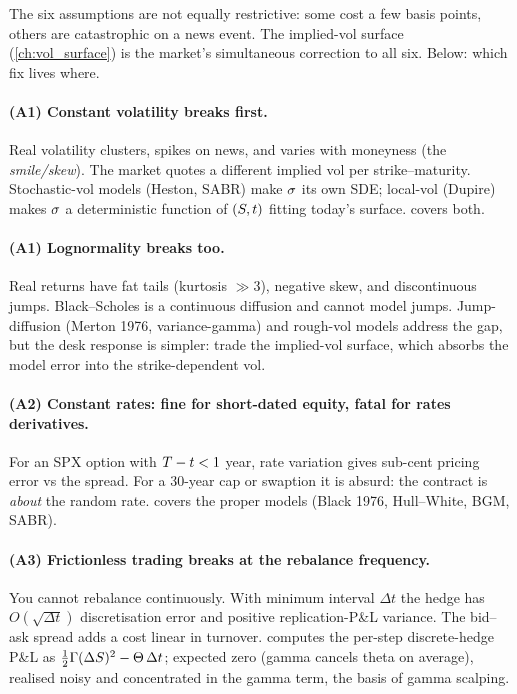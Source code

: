 The six assumptions are not equally restrictive: some cost a
few basis points, others are catastrophic on a news event. The
implied-vol surface (\cref{ch:vol_surface}) is the market's
simultaneous correction to all six. Below: which fix lives
where.

\paragraph{(A1) Constant volatility breaks first.}
Real volatility clusters, spikes on news, and varies with
moneyness (the \emph{smile/skew}). The market quotes a different
implied vol per strike--maturity. Stochastic-vol models (Heston,
SABR) make $\sigma$ its own SDE; local-vol (Dupire) makes
$\sigma$ a deterministic function of $(S, t)$ fitting today's
surface.  covers both.

\paragraph{(A1) Lognormality breaks too.}
Real returns have fat tails (kurtosis $\gg 3$), negative skew,
and discontinuous jumps. Black--Scholes is a continuous
diffusion and cannot model jumps. Jump-diffusion (Merton 1976,
variance-gamma) and rough-vol models address the gap, but the
desk response is simpler: trade the implied-vol surface, which
absorbs the model error into the strike-dependent vol.

\paragraph{(A2) Constant rates: fine for short-dated equity, fatal for rates derivatives.}
For an SPX option with $T - t < 1$ year, rate variation
gives sub-cent pricing error vs the spread. For a 30-year cap
or swaption it is absurd: the contract is \emph{about} the
random rate.  covers the proper
models (Black 1976, Hull--White, BGM, SABR).

\paragraph{(A3) Frictionless trading breaks at the rebalance frequency.}
You cannot rebalance continuously. With minimum interval
$\Delta t$ the hedge has $O(\sqrt{\Delta t})$ discretisation
error and positive replication-P\&L variance. The bid--ask
spread adds a cost linear in turnover. 
computes the per-step discrete-hedge P\&L as
$\tfrac12\Gamma(\Delta S)^2 - \Theta\,\Delta t$; expected zero
(gamma cancels theta on average), realised noisy and
concentrated in the gamma term, the basis of gamma scalping.

